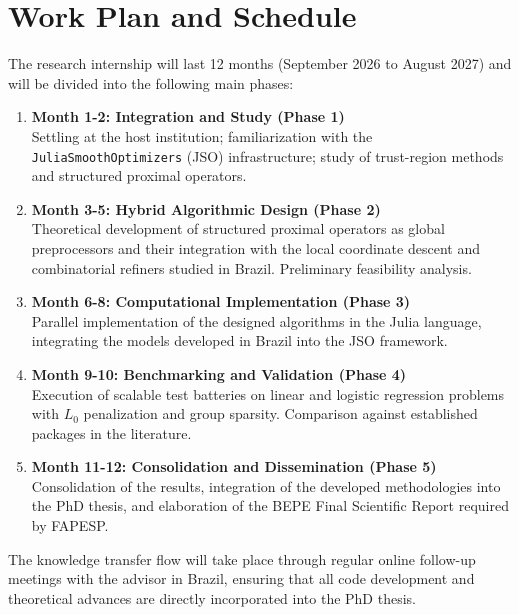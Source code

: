 \section{Work Plan and Schedule}

The research internship will last 12 months (September 2026 to August 2027) and will be divided into the following main phases:

\begin{enumerate}
    \item \textbf{Month 1-2: Integration and Study (Phase 1)} \\
    Settling at the host institution; familiarization with the \texttt{JuliaSmoothOptimizers} (JSO) infrastructure; study of trust-region methods and structured proximal operators.
    \item \textbf{Month 3-5: Hybrid Algorithmic Design (Phase 2)} \\
    Theoretical development of structured proximal operators as global preprocessors and their integration with the local coordinate descent and combinatorial refiners studied in Brazil. Preliminary feasibility analysis.
    \item \textbf{Month 6-8: Computational Implementation (Phase 3)} \\
    Parallel implementation of the designed algorithms in the Julia language, integrating the models developed in Brazil into the JSO framework.
    \item \textbf{Month 9-10: Benchmarking and Validation (Phase 4)} \\
    Execution of scalable test batteries on linear and logistic regression problems with $L_0$ penalization and group sparsity. Comparison against established packages in the literature.
    \item \textbf{Month 11-12: Consolidation and Dissemination (Phase 5)} \\
    Consolidation of the results, integration of the developed methodologies into the PhD thesis, and elaboration of the BEPE Final Scientific Report required by FAPESP.
\end{enumerate}

The knowledge transfer flow will take place through regular online follow-up meetings with the advisor in Brazil, ensuring that all code development and theoretical advances are directly incorporated into the PhD thesis.

